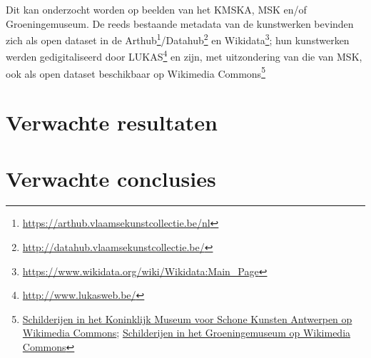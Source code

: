 \documentclass[fleqn,10pt]{voorstel}
\begin{document}
Dit kan onderzocht worden op beelden van het KMSKA, MSK en/of Groeningemuseum. De reeds bestaande metadata van de kunstwerken bevinden zich als open dataset in de Arthub\footnote{\url{https://arthub.vlaamsekunstcollectie.be/nl}}/Datahub\footnote{\url{http://datahub.vlaamsekunstcollectie.be/}} en Wikidata\footnote{\url{https://www.wikidata.org/wiki/Wikidata:Main_Page}}; hun kunstwerken werden gedigitaliseerd door LUKAS\footnote{\url{http://www.lukasweb.be/}} en zijn, met uitzondering van die van MSK, ook als open dataset beschikbaar op Wikimedia Commons\footnote{\href{https://commons.wikimedia.org/wiki/Paintings_in_the_Royal_Museum_of_Fine_Arts_Antwerp}{Schilderijen in het Koninklijk Museum voor Schone Kunsten Antwerpen op Wikimedia Commons}; \href{https://commons.wikimedia.org/wiki/Paintings_in_the_Groeningemuseum}{Schilderijen in het Groeningemuseum op Wikimedia Commons}}

\section{Verwachte resultaten}
\label{sec:verwachte_resultaten}


\section{Verwachte conclusies}
\label{sec:verwachte_conclusies}





\printbibliography[heading=bibintoc]
\end{document}

